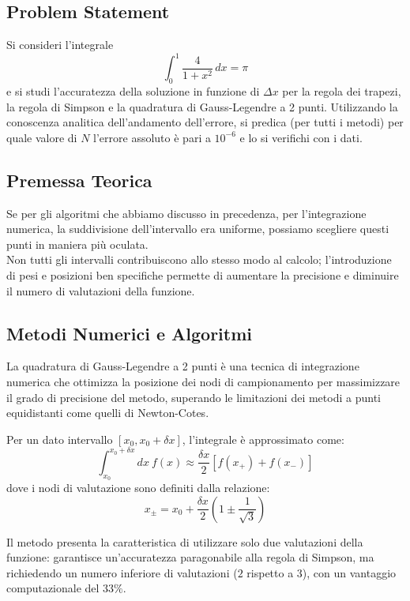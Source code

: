\subsection{Problem Statement}
Si consideri l'integrale
\[
\int_{0}^{1} \frac{4}{1 + x^2} \, dx = \pi
\]
e si studi l'accuratezza della soluzione in funzione di $\Delta x$ per la regola dei trapezi, la regola di Simpson e la quadratura di Gauss-Legendre a 2 punti. Utilizzando la conoscenza analitica dell'andamento dell'errore, si predica (per tutti i metodi) per quale valore di $N$ l'errore assoluto è pari a $10^{-6}$ e lo si verifichi con i dati.


\subsection{Premessa Teorica}
Se per gli algoritmi che abbiamo discusso in precedenza, per l'integrazione numerica, la suddivisione dell'intervallo era uniforme, possiamo scegliere questi punti in maniera più oculata.\\
Non tutti gli intervalli contribuiscono allo stesso modo al calcolo; l'introduzione di pesi e posizioni ben specifiche permette di aumentare la precisione e diminuire il numero di valutazioni della funzione.

\subsection{Metodi Numerici e Algoritmi}

La quadratura di Gauss-Legendre a 2 punti è una tecnica di integrazione numerica che ottimizza la posizione dei nodi di campionamento per massimizzare il grado di precisione del metodo, superando le limitazioni dei metodi a punti equidistanti come quelli di Newton-Cotes.

Per un dato intervallo $[x_0, x_0 + \delta x]$, l'integrale è approssimato come:
\begin{equation*}
    \int_{x_{0}}^{x_{0}+\delta x}dx~f(x) \approx \frac{\delta x}{2}[f(x_{+})+f(x_{-})]
\end{equation*}
dove i nodi di valutazione sono definiti dalla relazione:
\begin{equation*}
    x_{\pm} = x_0 + \frac{\delta x}{2} \left( 1 \pm \frac{1}{\sqrt{3}} \right)
\end{equation*}

Il metodo presenta la caratteristica di utilizzare solo due valutazioni della funzione: garantisce un'accuratezza paragonabile alla regola di Simpson, ma richiedendo un numero inferiore di valutazioni ($2$ rispetto a $3$), con un vantaggio computazionale del $33\%$.

